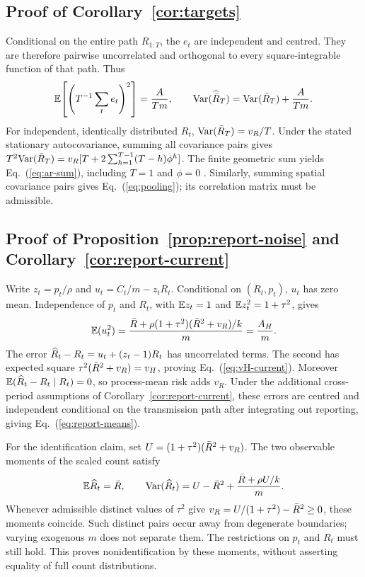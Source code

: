 \subsection{Proof of Corollary~\ref{cor:targets}}
\label{app:cor-targets}

Conditional on the entire path $R_{1:T}$, the $e_t$ are independent and centred. They are therefore pairwise uncorrelated and orthogonal to every square-integrable function of that path. Thus
\begin{equation}
 \mathbb{E}\!\left[\left(T^{-1}\sum_t e_t\right)^2\right]=\frac{A}{Tm},\qquad
 \mathrm{Var}(\widehat{\bar R}_T)=\mathrm{Var}(\bar R_T)+\frac{A}{Tm}.
\end{equation}
For independent, identically distributed $R_t$, $\mathrm{Var}(\bar R_T)=v_R/T$. Under the stated stationary autocovariance, summing all covariance pairs gives
$T^2\mathrm{Var}(\bar R_T)=v_R[T+2\sum_{h=1}^{T-1}(T-h)\phi^h]$.
The finite geometric sum yields Eq.~(\ref{eq:ar-sum}), including $T=1$ and $\phi=0$ \citep{hamilton1994time}. Similarly, summing spatial covariance pairs gives Eq.~(\ref{eq:pooling}); its correlation matrix must be admissible.

\subsection{Proof of Proposition~\ref{prop:report-noise} and Corollary~\ref{cor:report-current}}
\label{app:prop2}
\label{app:cor-report-current}

Write $z_t=p_t/\rho$ and $u_t=C_t/m-z_tR_t$. Conditional on $(R_t,p_t)$, $u_t$ has zero mean. Independence of $p_t$ and $R_t$, with $\mathbb{E} z_t=1$ and $\mathbb{E} z_t^2=1+\tau^2$, gives
\begin{equation}
 \mathbb{E}(u_t^2)=\frac{\bar R+\rho(1+\tau^2)(\bar R^2+v_R)/k}{m}
 =\frac{A_H}{m}.
\end{equation}
The error $\widehat R_t-R_t=u_t+(z_t-1)R_t$ has uncorrelated terms. The second has expected square $\tau^2(\bar R^2+v_R)=v_H$, proving Eq.~(\ref{eq:vH-current}). Moreover $\mathbb{E}(\widehat R_t-R_t\mid R_t)=0$, so process-mean risk adds $v_R$. Under the additional cross-period assumptions of Corollary~\ref{cor:report-current}, these errors are centred and independent conditional on the transmission path after integrating out reporting, giving Eq.~(\ref{eq:report-means}).

For the identification claim, set $U=(1+\tau^2)(\bar R^2+v_R)$. The two observable moments of the scaled count satisfy
\begin{equation}
 \mathbb{E}\widehat R_t=\bar R,\qquad
 \mathrm{Var}(\widehat R_t)=U-\bar R^2+\frac{\bar R+\rho U/k}{m}.
 \label{eq:moment-identification}
\end{equation}
Whenever admissible distinct values of $\tau^2$ give $v_R=U/(1+\tau^2)-\bar R^2\ge0$, these moments coincide. Such distinct pairs occur away from degenerate boundaries; varying exogenous $m$ does not separate them. The restrictions on $p_t$ and $R_t$ must still hold. This proves nonidentification by these moments, without asserting equality of full count distributions.

